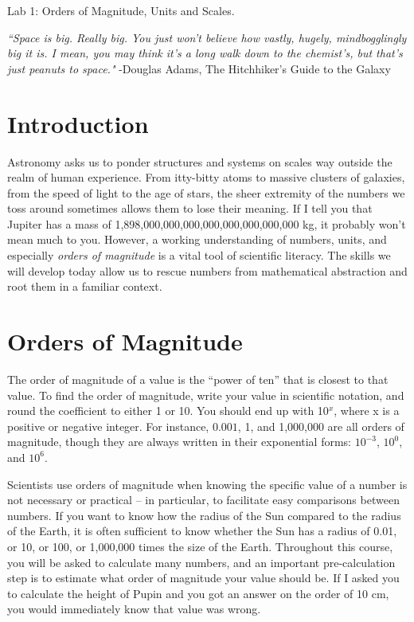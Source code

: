 \documentclass[12pt]{article}
\begin{document}
 \begin{center}
{\huge Lab 1: Orders of Magnitude, Units and Scales.}\\
\end{center}


\begin{center}
\noindent \textit{``Space is big. Really big. You just won't believe how vastly, hugely, mindbogglingly big it is. I mean, you may think it's a long walk down to the chemist's, but that's just peanuts to space."}
-Douglas Adams, The Hitchhiker's Guide to the Galaxy
\end{center}

\section*{Introduction}

Astronomy asks us to ponder structures and systems on scales way outside the realm of human experience. From itty-bitty atoms to massive clusters of galaxies, from the speed of light to the age of stars, the sheer extremity of the numbers we toss around sometimes allows them to lose their meaning. If I tell you that Jupiter has a mass of 1,898,000,000,000,000,000,000,000,000 kg, it probably won't mean much to you. However, a working understanding of numbers, units, and especially \textit{orders of magnitude} is a vital tool of scientific literacy. The skills we will develop today allow us to rescue numbers from mathematical abstraction and root them in a familiar context. 

\section*{Orders of Magnitude}

The order of magnitude of a value is the ``power of ten'' that is closest to that value. To find the order of magnitude, write your value in scientific notation, and round the coefficient to either 1 or 10. You should end up with 10${^x}$, where x is a positive or negative integer. For instance, $0.001$, 1, and 1,000,000 are all orders of magnitude, though they are always written in their exponential forms:
$10^{-3}$, $10^0$, and $10^6$.  

Scientists use orders of magnitude when knowing the specific value of a number is not necessary or practical -- in particular, to facilitate easy comparisons between numbers. If you want to know how the radius of the Sun compared to the radius of the Earth, it is often sufficient to know whether the Sun has a radius of 0.01, or 10, or 100, or 1,000,000 times the size of the Earth. Throughout this course, you will be asked to calculate many numbers, and an important pre-calculation step is to estimate what order of magnitude your value should be. If I asked you to calculate the height of Pupin and you got an answer on the order of 10 cm, you would immediately know that value was wrong.
\end{document}
